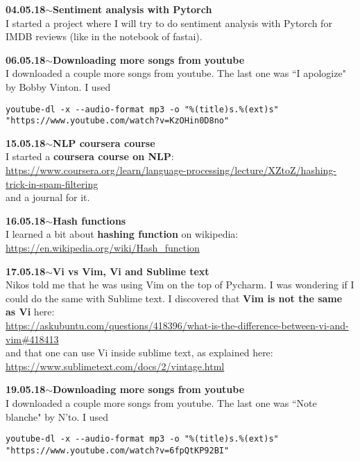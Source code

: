 \documentclass[11pt,a4paper]{article}
\newenvironment{loggentry}[2]%
{\noindent\textbf{#1}\hspace{1cm}$\mathbf{\sim}$\text{ }\textbf{#2}\\}{\vspace{0.5cm}}
\begin{document}
\begin{loggentry}{04.05.18}{Sentiment analysis with Pytorch}
I started a project where I will try to do sentiment analysis with Pytorch for IMDB reviews (like in the notebook of fastai).
\end{loggentry}

\begin{loggentry}{06.05.18}{Downloading more songs from youtube}
I downloaded a couple more songs from youtube. The last one was ``I apologize" by Bobby Vinton. I used
\begin{verbatim}
youtube-dl -x --audio-format mp3 -o "%(title)s.%(ext)s" "https://www.youtube.com/watch?v=KzOHin0D8no"
\end{verbatim}
\end{loggentry}

\begin{loggentry}{15.05.18}{NLP coursera course}
I started a \textbf{coursera course on NLP}:\\
\url{https://www.coursera.org/learn/language-processing/lecture/XZtoZ/hashing-trick-in-spam-filtering}\\
and a journal for it.\\
\end{loggentry}

\begin{loggentry}{16.05.18}{Hash functions}
I learned a bit about \textbf{hashing function} on wikipedia:\\
\url{https://en.wikipedia.org/wiki/Hash_function}\\
\end{loggentry}

\begin{loggentry}{17.05.18}{Vi vs Vim, Vi and Sublime text}
Nikos told me that he was using Vim on the top of Pycharm. I was wondering if I could do the same with Sublime text. I discovered that \textbf{Vim is not the same as Vi} here:\\
\url{https://askubuntu.com/questions/418396/what-is-the-difference-between-vi-and-vim#418413}\\
and that one can use Vi inside sublime text, as explained here:\\
\url{https://www.sublimetext.com/docs/2/vintage.html}\\

\end{loggentry}

\begin{loggentry}{19.05.18}{Downloading more songs from youtube}
I downloaded a couple more songs from youtube. The last one was ``Note blanche" by N'to. I used
\begin{verbatim}
youtube-dl -x --audio-format mp3 -o "%(title)s.%(ext)s" "https://www.youtube.com/watch?v=6fpQtKP92BI"
\end{verbatim}
\end{loggentry}
\end{document}
